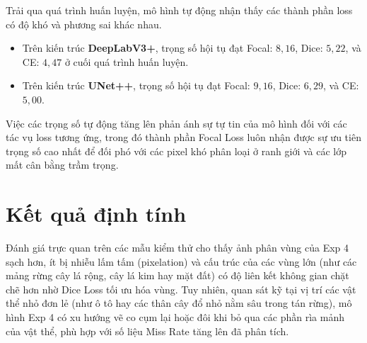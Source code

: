 Trải qua quá trình huấn luyện, mô hình tự động nhận thấy các thành phần loss có độ khó và phương sai khác nhau. 
\begin{itemize}[leftmargin=1.4cm]
  \item Trên kiến trúc \textbf{DeepLabV3+}, trọng số hội tụ đạt Focal: $8,16$, Dice: $5,22$, và CE: $4,47$ ở cuối quá trình huấn luyện.
  \item Trên kiến trúc \textbf{UNet++}, trọng số hội tụ đạt Focal: $9,16$, Dice: $6,29$, và CE: $5,00$.
\end{itemize}
Việc các trọng số tự động tăng lên phản ánh sự tự tin của mô hình đối với các tác vụ loss tương ứng, trong đó thành phần Focal Loss luôn nhận được sự ưu tiên trọng số cao nhất để đối phó với các pixel khó phân loại ở ranh giới và các lớp mất cân bằng trầm trọng.

\section{Kết quả định tính}
\label{sec:qualitative_results}

Đánh giá trực quan trên các mẫu kiểm thử cho thấy ảnh phân vùng của Exp 4 sạch hơn, ít bị nhiễu lấm tấm (pixelation) và cấu trúc của các vùng lớn (như các mảng rừng cây lá rộng, cây lá kim hay mặt đất) có độ liên kết không gian chặt chẽ hơn nhờ Dice Loss tối ưu hóa vùng. Tuy nhiên, quan sát kỹ tại vị trí các vật thể nhỏ đơn lẻ (như ô tô hay các thân cây đổ nhỏ nằm sâu trong tán rừng), mô hình Exp 4 có xu hướng vẽ co cụm lại hoặc đôi khi bỏ qua các phần rìa mảnh của vật thể, phù hợp với số liệu Miss Rate tăng lên đã phân tích.
